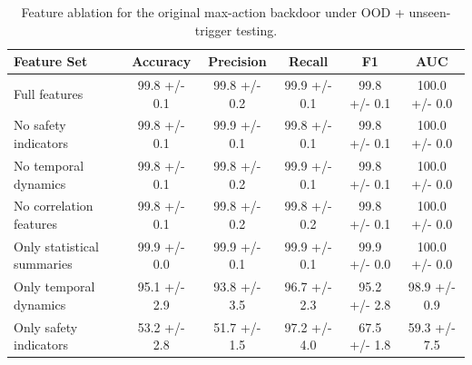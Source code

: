 \begin{table}[t]
\centering
\begin{tabular}{lccccc}
\hline
Feature Set & Accuracy & Precision & Recall & F1 & AUC \\
\hline
Full features & 99.8 +/- 0.1 & 99.8 +/- 0.2 & 99.9 +/- 0.1 & 99.8 +/- 0.1 & 100.0 +/- 0.0 \\
No safety indicators & 99.8 +/- 0.1 & 99.9 +/- 0.1 & 99.8 +/- 0.1 & 99.8 +/- 0.1 & 100.0 +/- 0.0 \\
No temporal dynamics & 99.8 +/- 0.1 & 99.8 +/- 0.2 & 99.9 +/- 0.1 & 99.8 +/- 0.1 & 100.0 +/- 0.0 \\
No correlation features & 99.8 +/- 0.1 & 99.8 +/- 0.2 & 99.8 +/- 0.2 & 99.8 +/- 0.1 & 100.0 +/- 0.0 \\
Only statistical summaries & 99.9 +/- 0.0 & 99.9 +/- 0.1 & 99.9 +/- 0.1 & 99.9 +/- 0.0 & 100.0 +/- 0.0 \\
Only temporal dynamics & 95.1 +/- 2.9 & 93.8 +/- 3.5 & 96.7 +/- 2.3 & 95.2 +/- 2.8 & 98.9 +/- 0.9 \\
Only safety indicators & 53.2 +/- 2.8 & 51.7 +/- 1.5 & 97.2 +/- 4.0 & 67.5 +/- 1.8 & 59.3 +/- 7.5 \\
\hline
\end{tabular}
\caption{Feature ablation for the original max-action backdoor under OOD + unseen-trigger testing.}
\label{tab:feature_ablation_robustness}
\end{table}
